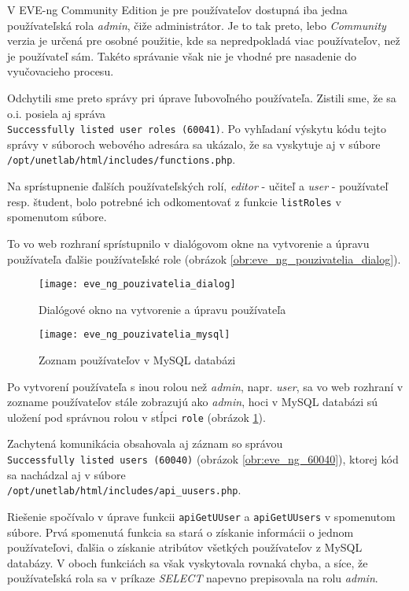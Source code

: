 V EVE-ng Community Edition je pre používateľov dostupná iba jedna používateľská rola \mbox{\emph{admin}}, čiže administrátor. Je to tak preto, lebo \emph{Community} verzia je určená pre osobné použitie, kde sa nepredpokladá viac používateľov, než je používateľ sám. Takéto správanie však nie je vhodné pre nasadenie do vyučovacieho procesu.

Odchytili sme preto správy pri úprave ľubovoľného používateľa. Zistili sme, že sa o.i. posiela aj správa \\
\texttt{Successfully listed user roles (60041)}. Po vyhľadaní výskytu kódu tejto správy v súboroch webového adresára sa ukázalo, že sa vyskytuje aj v súbore \\
\texttt{/opt/unetlab/html/includes/functions.php}.

Na sprístupnenie ďalších používateľských rolí, \emph{editor} - učiteľ a \emph{user} - používateľ resp. študent, bolo potrebné ich odkomentovať z funkcie \texttt{listRoles} v spomenutom súbore.

To vo web rozhraní sprístupnilo v dialógovom okne na vytvorenie a úpravu používateľa ďalšie používateľské role (obrázok \ref{obr:eve_ng_pouzivatelia_dialog}).

\begin{figure}
    \centering
    \texttt{[image: eve\_ng\_pouzivatelia\_dialog]}
    \caption{Dialógové okno na vytvorenie a úpravu používateľa}
    \label{obr:eve_ng_pouzivatelia_dialog}
    
    \centering
    \texttt{[image: eve\_ng\_pouzivatelia\_mysql]}
    \caption{Zoznam používateľov v MySQL databázi}
    \label{obr:eve_ng_pouzivatelia_mysql}
\end{figure}

Po vytvorení používateľa s inou rolou než \emph{admin}, napr. \emph{user}, sa vo web rozhraní v zozname používateľov stále zobrazujú ako \emph{admin}, hoci v MySQL databázi sú uložení pod správnou rolou v stĺpci \texttt{role} (obrázok \ref{obr:eve_ng_pouzivatelia_mysql}).

Zachytená komunikácia obsahovala aj záznam so správou \\
\texttt{Successfully listed users (60040)} (obrázok \ref{obr:eve_ng_60040}),
ktorej kód sa nachádzal aj v súbore \\
\texttt{/opt/unetlab/html/includes/api\_uusers.php}.

Riešenie spočívalo v úprave funkcii \texttt{apiGetUUser} a \texttt{apiGetUUsers} v spomenutom súbore. Prvá spomenutá funkcia sa stará o získanie informácii o jednom používateľovi, ďalšia o získanie atribútov všetkých používateľov z MySQL databázy. V oboch funkciách sa však vyskytovala rovnaká chyba, a síce, že používateľská rola sa v príkaze \emph{SELECT} napevno prepisovala na rolu \emph{admin}.

